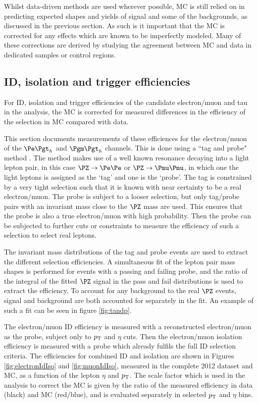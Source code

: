 Whilst data-driven methods are used wherever possible, \ac{MC} is still
relied on in predicting expected shapes and yields of signal and some of the
backgrounds, as discussed in the previous section.
As such is it important that the \ac{MC} is corrected for
any effects which are known to be imperfectly modeled. Many of these corrections
are derived by studying the agreement between \ac{MC} and data in dedicated
samples or control regions.

\subsection{ID, isolation and trigger efficiencies}
\label{sec:idisotrigger}

For ID, isolation and trigger efficiencies of the candidate electron/muon 
and tau in the analysis, the \ac{MC} is corrected for measured differences in 
the efficiency of the selection in \ac{MC} compared with data.

This section documents measurements of these efficiences for the electron/muon 
of the $\etau$ and $\mutau$ channels. This is done using a ``tag and probe"
method \cite{Khachatryan:2010xn}.
The method makes use of a well known resonance decaying
into a light lepton pair, in this case $\PZ\to\Pe\Pe$ or $\PZ\to\Pmu\Pmu$, 
in which one the light leptons is assigned as the `tag' and one is the `probe'. 
The tag is constrained by a very tight selection such that it is known with near 
certainty to be a real electron/muon. The probe is subject to a looser selection, 
but only tag/probe pairs with an invariant mass close to the $\PZ$ mass are used. 
This ensures that the probe is also a true electron/muon with high probability. 
Then the probe can be subjected to further cuts or constraints to measure the 
efficiency of such a selection to select real leptons.

The invariant mass distributions of the tag and probe events are used to extract
the different selection efficiencies. A simultaneous fit of the lepton pair mass
shapes is performed for events with a passing and failing probe, 
and the ratio of the integral of the fitted $\PZ$ signal 
in the pass and fail distributions is used to extract the efficiency. To account for any background
to the real $\PZ$ events, signal and background are both accounted for
separately in the fit. An example of such a fit can be seen in figure
\ref{fig:tandp}.

The electron/muon ID efficiency is measured with a reconstructed
electron/muon as the probe, subject only to $p_{\mathrm{T}}$ and $\eta$ cuts. 
Then the electron/muon isolation efficiency is measured
with a probe which already fulfils the full ID selection criteria. 
The efficiencies for combined ID and isolation are shown in Figures
\ref{fig:electronIdIso} and \ref{fig:muonIdIso}, measured in the complete 2012
dataset and \ac{MC}, as a function of the lepton $\eta$ and $p_{\mathrm{T}}$.
The scale factor which is used in the analysis to correct the \ac{MC} is given by the ratio of the
measured efficiency in data (black) and MC (red/blue), and is evaluated separately in
selected $p_{\mathrm{T}}$ and $\eta$ bins.

